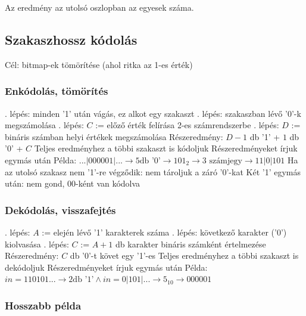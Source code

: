 \documentclass[12pt,a4paper]{article}
\begin{document}
\begin{outline}
	\1 Az eredmény az utolsó oszlopban az egyesek száma.
\end{outline}

\pagebreak

\subsection{Szakaszhossz kódolás}

\begin{outline}
	\1 Cél: bitmap-ek tömörítése (ahol ritka az 1-es érték)
	
\end{outline}

\subsubsection{Enkódolás, tömörítés}

\begin{outline}
	. lépés: minden '1' után vágás, ez alkot egy szakaszt
	. lépés: szakaszban lévő '0'-k megszámolása
	. lépés: $C$ := előző érték felírása 2-es számrendszerbe
	. lépés: $D$ := bináris számban helyi értékek megszámolása
	\1 Részeredmény: $D-1$ db '1' + $1$ db '0' + $C$
		\2 Teljes eredményhez a többi szakaszt is kódoljuk
		\2 Részeredményeket írjuk egymás után
	\1 Példa: $...|000001|... \to 5 \text{db '0'} \to 101_2 \to 3 \text{ számjegy} \to 11|0|101$
	\1 Ha az utolsó szakasz nem '1'-re végződik: nem tároljuk a záró '0'-kat
	\1 Két '1' egymás után: nem gond, $00$-ként van kódolva
\end{outline}

\subsubsection{Dekódolás, visszafejtés}

\begin{outline}
	. lépés: $A$ := elején lévő '1' karakterek száma
	. lépés: következő karakter ('0') kiolvasása
	. lépés: $C$ := $A+1$ db karakter bináris számként értelmezése
	\1 Részeredmény: $C$ db '0'-t követ egy '1'-es
		\2 Teljes eredményhez a többi szakaszt is dekódoljuk
		\2 Részeredményeket írjuk egymás után
	\1 Példa: $in=110101... \to 2\text{db '1'} \wedge in=0|101|... \to 5_{10} \to 000001$
\end{outline}

\subsubsection{Hosszabb példa}
\end{document}
